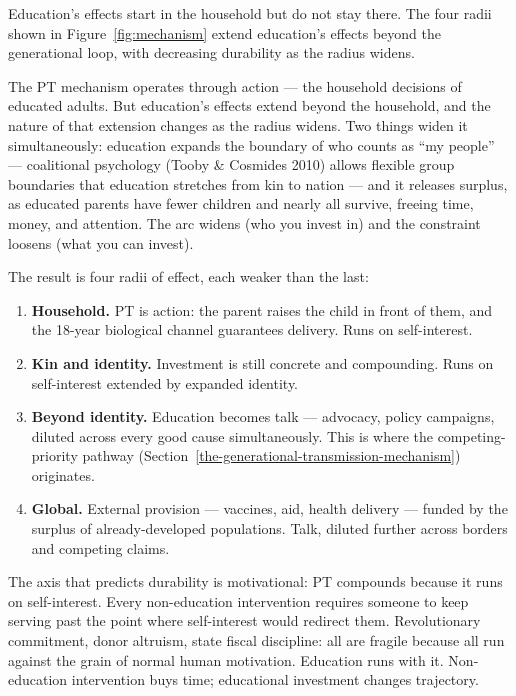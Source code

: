 \documentclass[12pt,letterpaper]{article}
\begin{document}
Education's effects start in the household but do not stay there. The
four radii shown in Figure~\ref{fig:mechanism} extend education's
effects beyond the generational loop, with decreasing durability as the
radius widens.

The PT mechanism operates through action --- the household decisions of
educated adults. But education's effects extend beyond the household,
and the nature of that extension changes as the radius widens. Two
things widen it simultaneously: education expands the boundary of who
counts as ``my people'' --- coalitional psychology (Tooby \& Cosmides
2010) allows flexible group boundaries that education stretches from kin
to nation --- and it releases surplus, as educated parents have fewer
children and nearly all survive, freeing time, money, and attention.
The arc widens (who you invest in) and the constraint loosens (what you
can invest).

The result is four radii of effect, each weaker than the last:

\begin{enumerate}
\item \textbf{Household.} PT is action: the parent raises the child in
front of them, and the 18-year biological channel guarantees delivery.
Runs on self-interest.

\item \textbf{Kin and identity.} Investment is still concrete and
compounding. Runs on self-interest extended by expanded identity.

\item \textbf{Beyond identity.} Education becomes talk --- advocacy,
policy campaigns, diluted across every good cause simultaneously.
This is where the competing-priority pathway
(Section~\ref{the-generational-transmission-mechanism}) originates.

\item \textbf{Global.} External provision --- vaccines, aid, health
delivery --- funded by the surplus of already-developed populations.
Talk, diluted further across borders and competing claims.
\end{enumerate}

The axis that predicts durability is motivational: PT compounds because
it runs on self-interest. Every non-education intervention requires
someone to keep serving past the point where self-interest would redirect
them. Revolutionary commitment, donor altruism, state fiscal discipline:
all are fragile because all run against the grain of normal human
motivation. Education runs with it. Non-education intervention buys
time; educational investment changes trajectory.
\end{document}
